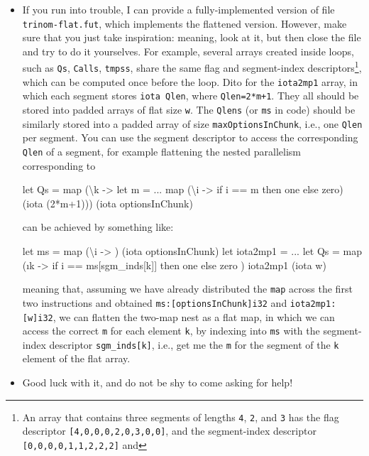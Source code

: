 \documentclass[a4paper,11pt]{article}
\begin{document}
\begin{itemize}
    \item[(3)] If you run into trouble, I can provide a fully-implemented
        version of file {\tt trinom-flat.fut}, which implements the flattened 
        version. However, make sure that you
        just take inspiration: meaning, look at it, but then close the
        file and try to do it yourselves. For example, several arrays
        created inside loops, such as {\tt Qs}, {\tt Calls}, {\tt tmpss},
        share the same flag and segment-index descriptors\footnote{
            An array that contains three segments of lengths {\tt 4}, {\tt 2},
            and {\tt 3} has the flag descriptor {\tt [4,0,0,0,2,0,3,0,0]},
            and the segment-index descriptor {\tt [0,0,0,0,1,1,2,2,2]} and 
        }, which can be computed once before the loop. Dito for
        the {\tt iota2mp1} array, in which each segment stores {\tt iota Qlen},
        where {\tt Qlen=2*m+1}.
        They all should be stored into padded arrays of flat size {\tt w}.
        The {\tt Qlens} (or {\tt ms} in code) should be similarly stored
        into a padded array of size {\tt maxOptionsInChunk}, i.e., one {\tt Qlen}
        per segment.  You can use the segment descriptor to access
        the corresponding {\tt Qlen} of a segment, for example flattening
        the nested parallelism corresponding to 

\begin{fancycode}
   let Qs = map (\textbackslash{}k ->
                    let m = ...
                    map (\textbackslash{}i -> if i == m then one else zero) (iota (2*m+1)))
                (iota optionsInChunk)
\end{fancycode}

        can be achieved by something like:

\begin{fancycode}
  let ms       = map (\textbackslash{}i -> ) (iota optionsInChunk)
  let iota2mp1 = ...
  let Qs = map (\i k -> if i == ms[sgm_inds[k]] then one else zero 
               ) iota2mp1 (iota w)
\end{fancycode}

    meaning that, assuming we have already distributed the {\tt map} across the
    first two instructions and obtained {\tt ms:[optionsInChunk]i32} and
    {\tt iota2mp1:[w]i32}, we can flatten the two-map nest as a flat map,
    in which we can access the correct {\tt m} for each element {\tt k}, by indexing
    into {\tt ms} with the segment-index descriptor {\tt sgm\_inds[k]}, i.e.,
    get me the {\tt m} for the segment of the {\tt k} element of the flat array.

    \item[(4)] Good luck with it, and do not be shy to come asking for help!

\end{itemize}
\end{document}
